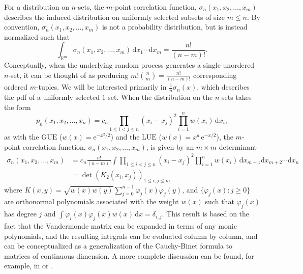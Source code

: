 \documentclass[pdftex, oneside, 10pt, letterpaper]{amsart}
\theoremstyle{plain}
\theoremstyle{definition}
\theoremstyle{remark}
\begin{document}
For a distribution on $n$-sets, the $m$-point correlation function,
$\sigma_n(x_1,x_2,\dotsc,x_m)$ describes the induced distribution on
uniformly selected subsets of size $m\leq{}n$.  By convention,
$\sigma_n(x_1,x_2,\dotsc,x_m)$ is not a probability distribution, but
is instead normalized such that
\[
\int_{\mathbb{R}^m}\sigma_n(x_1,x_2,\dotsc,x_m)\,\mathrm{d}x_1\dotsb\mathrm{d}x_m=\frac{n!}{(n-m)!}.
\]
Conceptually, when the underlying random process generates a single
unordered $n$-set, it can be thought of as producing
$m!\binom{n}{m}=\frac{n!}{(n-m)!}$ corresponding ordered $m$-tuples.
We will be interested primarily in $\frac{1}{n}\sigma_n(x)$, which
describes the pdf of a uniformly selected $1$-set.  When the
distribution on the $n$-sets takes the form
\[
p_n(x_1,x_2,\dotsc,x_n)=c_n\prod_{1\leq{}i<j\leq{}n}(x_i-x_j)^2\prod_{i=1}^n{}w(x_i)\,\mathrm{d}x_i,
\]
as with the {\ensuremath{\mathrm{GUE}}}{} ($w(x)=\mathrm{e}^{-x^2/2}$) and the {\ensuremath{\mathrm{LUE}}}{}
($w(x)=x^a\,\mathrm{e}^{-x/2}$), the $m$-point correlation function,
$\sigma_n(x_1,x_2,\dotsc,x_m)$, is given by an $m\times{}m$
determinant
\begin{equation}\label{eqn:m-pointcorrelation}
  \begin{split}
    \sigma_n(x_1,x_2,\dotsc,x_m)
    &=c_n\frac{n!}{(n-m)!}\int\prod_{1\leq{}i<j\leq{}n}(x_i-x_j)^2\prod_{i=1}^nw(x_i)\,
    \mathrm{d}x_{m+1}\mathrm{d}x_{m+2}\dotsb\mathrm{d}x_{n}\\ 
    &=\det\left(K_2(x_i,x_j)\right)_{1\leq{}i,j\leq{}m}
  \end{split}
\end{equation}
where
$K(x,y)=\sqrt{w(x)w(y)}\sum_{j=0}^{n-1}\varphi_j(x)\varphi_j(y)$, and
$\{\varphi_{j}(x)\colon j\geq0\}$ are orthonormal polynomials
associated with the weight $w(x)$ such that $\varphi_j(x)$ has degree
$j$ and $\int\varphi_i(x)\varphi_j(x)w(x)\,\mathrm{d}x=\delta_{i,j}$.
This result is based on the fact that the Vandermonde matrix can be
expanded in terms of any monic polynomials, and the resulting
integrals can be evaluated column by column, and can be conceptualized
as a generalization of the Cauchy-Binet formula to matrices of
continuous dimension.  A more complete discussion can be found, for
example, in \cite[Sec.~5.4]{Deift-OP} or \cite[Ch.~5]{Mehta}. 
\end{document}
